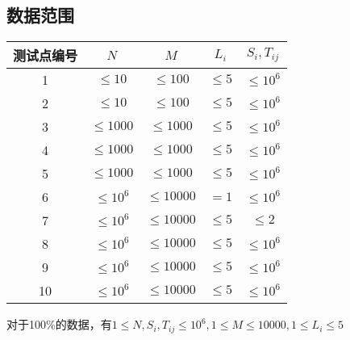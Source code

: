 \documentclass[12pt]{ctexart}
\begin{document}
\subsection{数据范围}
\begin{center}
	\begin{tabular}{|c|c|c|c|c|}
		\hline 测试点编号&$N$&$M$&$L_i$&$S_i,T_{ij}$\\
		\hline 1&$\leq10$&$\leq100$&$\leq5$&$\leq10^6$\\
		\hline 2&$\leq10$&$\leq100$&$\leq5$&$\leq10^6$\\
		\hline 3&$\leq1000$&$\leq1000$&$\leq5$&$\leq10^6$\\
		\hline 4&$\leq1000$&$\leq1000$&$\leq5$&$\leq10^6$\\
		\hline 5&$\leq1000$&$\leq1000$&$\leq5$&$\leq10^6$\\
		\hline 6&$\leq10^6$&$\leq10000$&$=1$&$\leq10^6$\\
		\hline 7&$\leq10^6$&$\leq10000$&$\leq 5$&$\leq2$\\
		\hline 8&$\leq10^6$&$\leq10000$&$\leq 5$&$\leq10^6$\\
		\hline 9&$\leq10^6$&$\leq10000$&$\leq 5$&$\leq10^6$\\
		\hline 10&$\leq10^6$&$\leq10000$&$\leq 5$&$\leq10^6$\\
		\hline
	\end{tabular}
\end{center}
对于100\%的数据，有$1\le N,S_i,T_{ij}\le10^6,1\le M\le10000,1\le L_i\le5$
\end{document}
